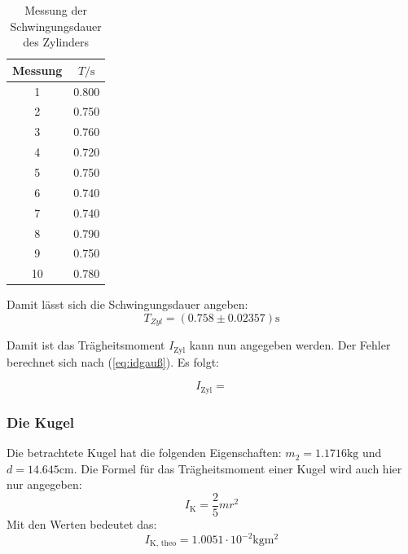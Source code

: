 \begin{table}
  \centering
  \caption{Messung der Schwingungsdauer des Zylinders}
  \label{tab:SchwingungsdauerZylinder}
  \begin{tabular}{c c}
    \toprule
     Messung &  $T / \unit\second$ \\
    \midrule
              1 &        0.800 \\
              2 &        0.750 \\
              3 &        0.760 \\
              4 &        0.720 \\
              5 &        0.750 \\
              6 &        0.740 \\
              7 &        0.740 \\
              8 &        0.790 \\
              9 &        0.750 \\
             10 &        0.780 \\
    \bottomrule
  \end{tabular}
\end{table}

Damit lässt sich die Schwingungsdauer angeben:
\begin{equation*}
  T_{Zyl} = (0.758 \pm 0.02357) \unit{\second}
\end{equation*}


Damit ist das Trägheitsmoment $I_{\text{Zyl}}$ kann nun angegeben werden.
Der Fehler berechnet sich nach (\ref{eq:idgauß}). Es folgt:


\begin{equation*}
  I_{\text{Zyl}} = 
\end{equation*}


\subsubsection*{Die Kugel}

Die betrachtete Kugel hat die folgenden Eigenschaften: $m_2 = 1.1716\unit{\kilo\gram}$ und $d = 14.645\unit{\centi\meter}$.
Die Formel für das Trägheitsmoment einer Kugel wird auch hier nur angegeben:
\begin{equation*}
  I_{\text{K}} = \frac{2}{5} m r^2
\end{equation*}
Mit den Werten bedeutet das:
\begin{equation*}
  I_{\text{K, theo}} = 1.0051 \cdot 10^{-2} \unit{\kilo\gram\meter\squared}
\end{equation*}

